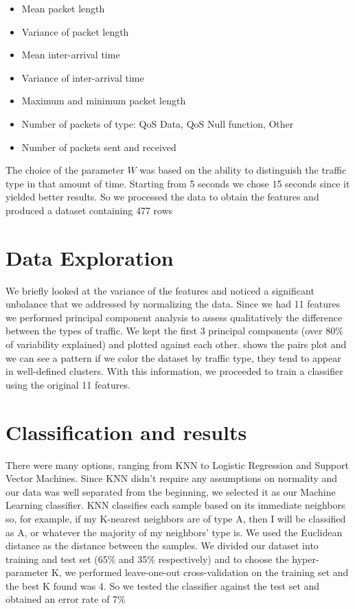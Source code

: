 \documentclass[11pt, USenglish]{article}
\begin{document}
\begin{itemize}
    \item Mean packet length
    \item Variance of packet length
    \item Mean inter-arrival time
    \item Variance of inter-arrival time
    \item Maximum and minimum packet length
    \item Number of packets of type: QoS Data, QoS Null function, Other
    \item Number of packets sent and received

\end{itemize}

The choice of the parameter $W$ was based on the ability to distinguish the traffic type in that
amount of time. Starting from 5 seconds we chose 15 seconds since it yielded better results. So we
processed the data to obtain the features and produced a dataset containing 477 rows


\section{Data Exploration}
We briefly looked at the variance of the features and noticed a significant unbalance %
that we addressed by normalizing the data. Since we had 11 features we performed principal component
analysis to assess qualitatively the difference between the types of traffic. We kept the first 3
principal components (over 80\% of variability explained) and plotted against each other. %
shows the pairs plot and we can see a pattern if we color the dataset by traffic type, they tend to
appear in well-defined clusters. With this information, we proceeded to train a classifier using the
original 11 features.


\section{Classification and results}
There were many options, ranging from KNN to Logistic Regression and Support Vector Machines.
Since KNN didn’t require any assumptions on normality and our data was well separated from the
beginning, we selected it as our Machine Learning classifier. KNN classifies each sample based on
its immediate neighbors so, for example, if my K-nearest neighbors are of type A, then I will
be classified as A, or whatever the majority of my neighbors’ type is. We used the Euclidean
distance as the distance between the samples. We divided our dataset into training and test set (65\%
and 35\% respectively) and to choose the hyper-parameter K, we performed leave-one-out
cross-validation on the training set and the best K found was 4. So we tested the classifier against
the test set and obtained an error rate of 7\%
\end{document}
